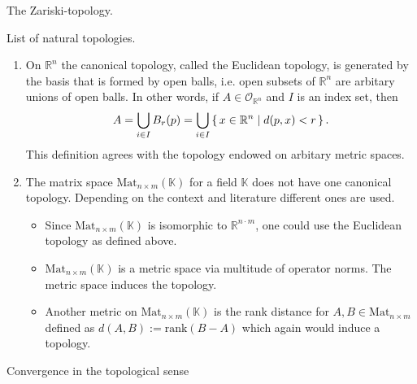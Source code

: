 \begin{exmbox}
    \begin{example}
        The Zariski-topology.
    \end{example}
\end{exmbox}
%
\begin{exmbox}
    \begin{example}
        List of natural topologies.
        \begin{enumerate}
            \item On \(\mathbb{R}^n\) the canonical topology, called the Euclidean topology, is generated by the basis that is formed by open balls, i.e. open subsets of \(\mathbb{R}^n\) are arbitary unions of open balls. In other words, if \(A \in \mathcal{O}_{\mathbb{R}^n}\) and \(I\) is an index set, then
            \begin{equation*}
                A = \bigcup_{i \in I} B_r(p) = \bigcup_{i \in I} \left\{\, x \in \mathbb{R}^n \mid d(p, x) < r \,\right\} \text{.}
            \end{equation*}
            This definition agrees with the topology endowed on arbitary metric spaces.
            \item The matrix space \(\mathrm{Mat}_{n \times m}(\mathbb{K})\) for a field \(\mathbb{K}\) does not have one canonical topology. Depending on the context and literature different ones are used.
            \begin{itemize}
                \item Since \(\mathrm{Mat}_{n \times m}(\mathbb{K})\) is isomorphic to \(\mathbb{R}^{n \cdot m}\), one could use the Euclidean topology as defined above.
                \item \(\mathrm{Mat}_{n \times m}(\mathbb{K})\) is a metric space via multitude of operator norms. The metric space induces the topology.
                \item Another metric on \(\mathrm{Mat}_{n \times m}(\mathbb{K})\) is the rank distance for \(A, B \in \mathrm{Mat}_{n \times m}\) defined as \(d(A, B) := \mathrm{rank}(B - A)\) which again would induce a topology.
            \end{itemize}
        \end{enumerate}
    \end{example}
\end{exmbox}
%
\begin{defbox}
    \begin{definition}
        Convergence in the topological sense
    \end{definition}
\end{defbox}

